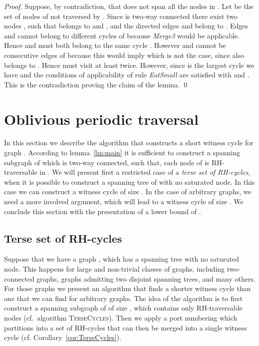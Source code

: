\documentclass[11pt,envcountsame,oribibl]{llncs}
\begin{document}
\begin{proof}
Suppose, by contradiction, that  does not span all the nodes in .
Let  be the set of nodes of  not traversed by .
Since  is two-way connected there exist two nodes ,
such that  belongs to  and , and the directed edges 
and  belong to . Edges  and  cannot belong
to different cycles of  because {\em Merge3} would be applicable.
Hence   and  must both belong to the same cycle . However 
and  cannot be consecutive edges of  because this would imply 
which is not the case, since  also belongs to . Hence  must visit 
at least twice.
However, since  is the largest cycle we have 
and the conditions of applicability of rule {\em EatSmall} are satisfied with
 and . This is the contradiction proving the claim
of the lemma. \hfill \qed
\end{proof}






\section{Oblivious periodic traversal}

\noindent
In this section we describe the algorithm that constructs a short witness
cycle for graph . According to lemma~\ref{lm:main} it is
sufficient to construct a spanning subgraph  of 
which is two-way connected, such that,
each node of  is RH-traversable in . We will
present first a restricted case of a {\em terse set of RH-cycles}, when
it is possible to construct a spanning tree of  with no saturated
node. In this case we can construct a witness cycle of size .
In the case of arbitrary graphs, we need a more involved argument,
which will lead to a witness cycle of size . We
conclude this section with the presentation of
a lower bound of .

\subsection{Terse set of RH-cycles}

\noindent
Suppose that we have a graph , which has a spanning tree  with no saturated node.
This happens for large and non-trivial classes of graphs, including two-connected graphs,
graphs admitting two disjoint spanning trees, and many others. For those graphs we present
an algorithm that finds a shorter witness cycle than one that we can find for arbitrary
graphs. The idea of the algorithm is to first construct a spanning subgraph of 
 of size ,
which contains only RH-traversable
nodes (cf.\ algorithm \textsc{TerseCycles}). Then we apply a port numbering
which partitions  into a set of RH-cycles that can then
be merged into a single witness cycle (cf. Corollary~\ref{cor:TerseCycles}).
\end{document}
